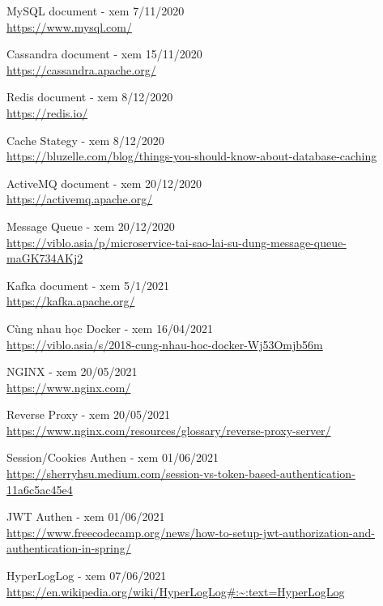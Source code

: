 \documentclass[12pt,a4paper,oneside]{book}
\begin{document}
\begin{thebibliography}{80}
         MySQL document - xem 7/11/2020\\
        \url{https://www.mysql.com/}
        
         Cassandra document - xem 15/11/2020\\
        \url{https://cassandra.apache.org/}
        
         Redis document - xem 8/12/2020\\
        \url{https://redis.io/}
        
         Cache Stategy - xem 8/12/2020\\
        \url{https://bluzelle.com/blog/things-you-should-know-about-database-caching}
        
         ActiveMQ document - xem 20/12/2020\\
        \url{https://activemq.apache.org/}
        
         Message Queue - xem 20/12/2020\\
        \url{https://viblo.asia/p/microservice-tai-sao-lai-su-dung-message-queue-maGK734AKj2}
        
         Kafka document - xem 5/1/2021\\
        \url{https://kafka.apache.org/}
        
         Cùng nhau học Docker - xem 16/04/2021\\
        \url{https://viblo.asia/s/2018-cung-nhau-hoc-docker-Wj53Omjb56m}
        
         NGINX - xem 20/05/2021\\
        \url{https://www.nginx.com/}
        
         Reverse Proxy - xem 20/05/2021\\
        \url{https://www.nginx.com/resources/glossary/reverse-proxy-server/}
        
         Session/Cookies Authen - xem 01/06/2021\\
        \url{https://sherryhsu.medium.com/session-vs-token-based-authentication-11a6c5ac45e4}
        
         JWT Authen - xem 01/06/2021\\
        \url{https://www.freecodecamp.org/news/how-to-setup-jwt-authorization-and-authentication-in-spring/}
        
         HyperLogLog - xem 07/06/2021\\
        \url{ https://en.wikipedia.org/wiki/HyperLogLog#:~:text=HyperLogLog}
        
        
       
        
        
        
        
        

    \end{thebibliography}
\end{document}
